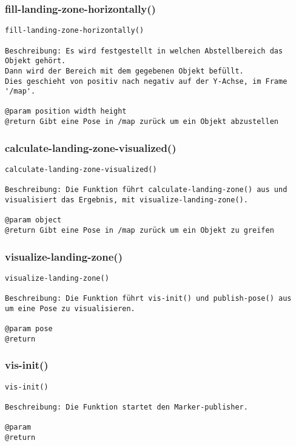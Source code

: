 \documentclass{suturo}
\begin{document}
\subsubsection{fill-landing-zone-horizontally()}
\begin{verbatim}
fill-landing-zone-horizontally()

Beschreibung: Es wird festgestellt in welchen Abstellbereich das Objekt gehört.
Dann wird der Bereich mit dem gegebenen Objekt befüllt.
Dies geschieht von positiv nach negativ auf der Y-Achse, im Frame '/map'.

@param position width height
@return Gibt eine Pose in /map zurück um ein Objekt abzustellen
\end{verbatim}

\subsubsection{calculate-landing-zone-visualized()}
\begin{verbatim}
calculate-landing-zone-visualized()

Beschreibung: Die Funktion führt calculate-landing-zone() aus und
visualisiert das Ergebnis, mit visualize-landing-zone().

@param object
@return Gibt eine Pose in /map zurück um ein Objekt zu greifen
\end{verbatim}

\subsubsection{visualize-landing-zone()}
\begin{verbatim}
visualize-landing-zone()

Beschreibung: Die Funktion führt vis-init() und publish-pose() aus
um eine Pose zu visualisieren.

@param pose
@return 
\end{verbatim}

\subsubsection{vis-init()}
\begin{verbatim}
vis-init()

Beschreibung: Die Funktion startet den Marker-publisher.

@param 
@return 
\end{verbatim}
\end{document}
